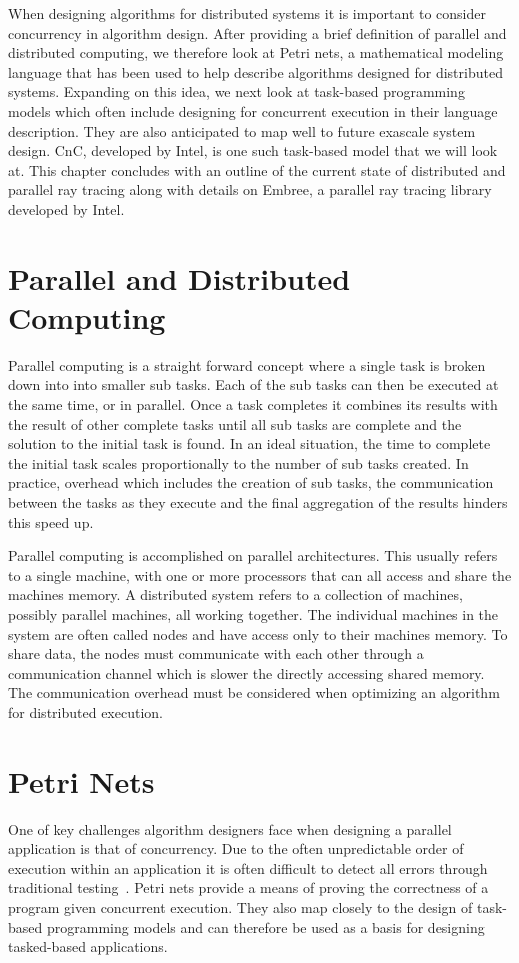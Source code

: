 When designing algorithms for distributed systems it is important to consider 
concurrency in algorithm design.  After providing a brief definition of parallel
and distributed computing, we therefore look at Petri nets, a mathematical 
modeling language that has been used to help describe algorithms designed for 
distributed systems.  Expanding on this idea, we next look at task-based 
programming models which often include designing for concurrent execution in
their language description.  They are also anticipated to map well to future 
exascale system design.  CnC, developed by Intel, is one such task-based model 
that we will look at.  This chapter concludes with an outline of the current 
state of distributed and parallel ray tracing along with details on Embree, a
parallel ray tracing library developed by Intel.

\section{Parallel and Distributed Computing}
\label{computing}

Parallel computing is a straight forward concept where a single task is broken 
down into into smaller sub tasks.  Each of the sub tasks can then be executed at
the same time, or in parallel.  Once a task completes it combines its results 
with the result of other complete tasks until all sub tasks are complete and the
solution to the initial task is found.  In an ideal situation, the time to 
complete the initial task scales proportionally to the number of sub tasks 
created.  In practice, overhead which includes the creation of sub tasks, 
the communication between the tasks as they execute and the final aggregation of 
the results hinders this speed up.

Parallel computing is accomplished on parallel architectures.  This usually 
refers to a single machine, with one or more processors that can all access and
share the machines memory.  A distributed system refers to a collection of
machines, possibly parallel machines, all working together.  The individual 
machines in the system are often called nodes and have access only to their 
machines memory.  To share data, the nodes must communicate with each other
through a communication channel which is slower the directly accessing shared
memory.  The communication overhead must be considered when optimizing an 
algorithm for distributed execution.

\section{Petri Nets}
\label{sec:petri-nets}
One of key challenges algorithm designers face when designing a parallel 
application is that of concurrency.  Due to the often unpredictable order of
execution within an application it is often difficult to detect all errors 
through traditional testing~\cite{franco2012true}.  Petri nets provide a means 
of proving the correctness of a program given concurrent execution.  They also 
map closely to the design of task-based programming models and can therefore be 
used as a basis for designing tasked-based applications.

